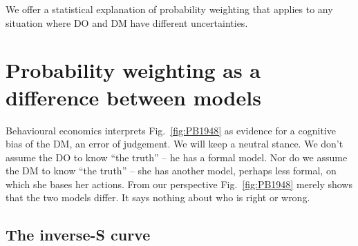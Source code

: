 \documentclass[12pt,letter,timesnewroman]{article}
\newcommand{\fref}[1]{Fig.~\ref{fig:#1}}
\newcommand{\seclabel}[1]{\label{sec:#1}}
\newcommand{\MK}[1]{\textcolor{red}{\textit{***MK: #1 MK***}}}
\begin{document}
We offer a statistical explanation of probability weighting that applies to any situation where DO and DM have different uncertainties.

%
% 
%



\section{Probability weighting as a difference between models} \seclabel{ModelDiff}
Behavioural economics interprets \fref{PB1948} as evidence for a cognitive bias of the DM, an error of judgement. We will keep a neutral stance. We don't assume the DO to know ``the truth'' -- he has a formal model. Nor do we assume the DM to know ``the truth'' -- she has another model, perhaps less formal, on which she bases her actions. From our perspective \fref{PB1948} merely shows that the two models differ. It says nothing about who is right or wrong.

\subsection{The inverse-S curve\seclabel{The_inverse}}
\end{document}

